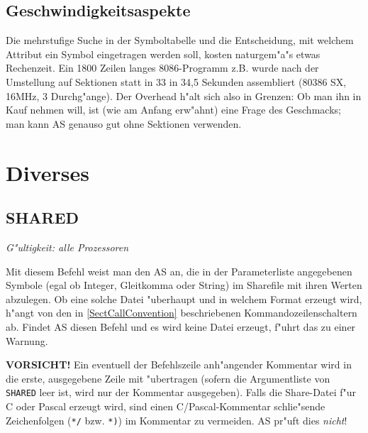 \documentclass[12pt,a4paper,twoside]{report}
\makeatletter
\newcommand{\ii}[1]{{\it #1}}
\newcommand{\bb}[1]{{\bf #1}}
\newcommand{\tty}[1]{{\tt #1}}
\newcommand{\ttindex}[1]{\index{#1@{\tt #1}}}
\newcommand{\asname}{AS}
\makeatother
\begin{document}

\subsection{Geschwindigkeitsaspekte}

Die mehrstufige Suche in der Symboltabelle und die Entscheidung, mit welchem
Attribut ein Symbol eingetragen werden soll, kosten naturgem"a"s etwas
Rechenzeit.  Ein 1800 Zeilen langes 8086-Programm z.B. wurde nach der
Umstellung auf Sektionen statt in 33 in 34,5 Sekunden assembliert
(80386 SX, 16MHz, 3 Durchg"ange).  Der Overhead h"alt sich also in Grenzen:
Ob man ihn in Kauf nehmen will, ist (wie am Anfang erw"ahnt) eine Frage des
Geschmacks;  man kann \asname{} genauso gut ohne Sektionen verwenden.


\section{Diverses}


\subsection{SHARED}
\label{ChapShareOrder} \ttindex{SHARED}

{\em G"ultigkeit: alle Prozessoren}

Mit diesem Befehl weist man den \asname{} an, die in der Parameterliste
angegebenen Symbole (egal ob Integer, Gleitkomma oder String) im
Sharefile mit ihren Werten abzulegen.  Ob eine solche Datei "uberhaupt
und in welchem Format erzeugt wird, h"angt von den in
\ref{SectCallConvention} beschriebenen Kommandozeilenschaltern ab.
Findet \asname{} diesen Befehl und es wird keine Datei erzeugt, f"uhrt das zu
einer Warnung.
\par
\bb{VORSICHT!} Ein eventuell der Befehlszeile anh"angender Kommentar
wird  in die erste, ausgegebene Zeile mit "ubertragen (sofern die
Argumentliste von \tty{SHARED} leer ist, wird nur der Kommentar ausgegeben).
Falls die Share-Datei f"ur C oder Pascal erzeugt wird, sind einen
C/Pascal-Kommentar schlie"sende Zeichenfolgen (\verb!*/! bzw.
\verb!*)!) im Kommentar zu vermeiden.  \asname{} pr"uft dies \ii{nicht}!
\end{document}
